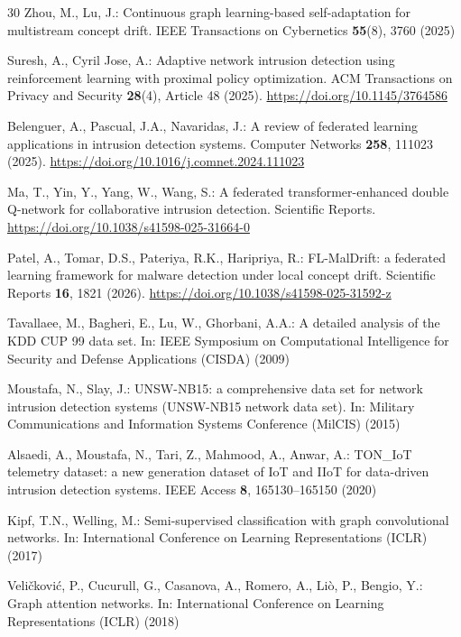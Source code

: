 \documentclass[twocolumn]{llncs}
\begin{document}
\begin{thebibliography}{30}
Zhou, M., Lu, J.: Continuous graph learning-based self-adaptation for multistream concept drift.
IEEE Transactions on Cybernetics \textbf{55}(8), 3760 (2025)

Suresh, A., Cyril Jose, A.: Adaptive network intrusion detection using reinforcement learning with
proximal policy optimization. ACM Transactions on Privacy and Security \textbf{28}(4), Article 48
(2025). \url{https://doi.org/10.1145/3764586}

Belenguer, A., Pascual, J.A., Navaridas, J.: A review of federated learning applications in
intrusion detection systems. Computer Networks \textbf{258}, 111023 (2025).
\url{https://doi.org/10.1016/j.comnet.2024.111023}

Ma, T., Yin, Y., Yang, W., Wang, S.: A federated transformer-enhanced double Q-network for
collaborative intrusion detection. Scientific Reports.
\url{https://doi.org/10.1038/s41598-025-31664-0}

Patel, A., Tomar, D.S., Pateriya, R.K., Haripriya, R.: FL-MalDrift: a federated learning framework
for malware detection under local concept drift. Scientific Reports \textbf{16}, 1821 (2026).
\url{https://doi.org/10.1038/s41598-025-31592-z}

Tavallaee, M., Bagheri, E., Lu, W., Ghorbani, A.A.: A detailed analysis of the KDD CUP 99 data
set. In: IEEE Symposium on Computational Intelligence for Security and Defense Applications
(CISDA) (2009)

Moustafa, N., Slay, J.: UNSW-NB15: a comprehensive data set for network intrusion detection
systems (UNSW-NB15 network data set). In: Military Communications and Information Systems
Conference (MilCIS) (2015)

Alsaedi, A., Moustafa, N., Tari, Z., Mahmood, A., Anwar, A.: TON\_IoT telemetry dataset: a new
generation dataset of IoT and IIoT for data-driven intrusion detection systems. IEEE Access
\textbf{8}, 165130--165150 (2020)

Kipf, T.N., Welling, M.: Semi-supervised classification with graph convolutional networks. In:
International Conference on Learning Representations (ICLR) (2017)

Veli\v{c}kovi\'{c}, P., Cucurull, G., Casanova, A., Romero, A., Li\`{o}, P., Bengio, Y.: Graph
attention networks. In: International Conference on Learning Representations (ICLR) (2018)


\end{thebibliography}
\end{document}
